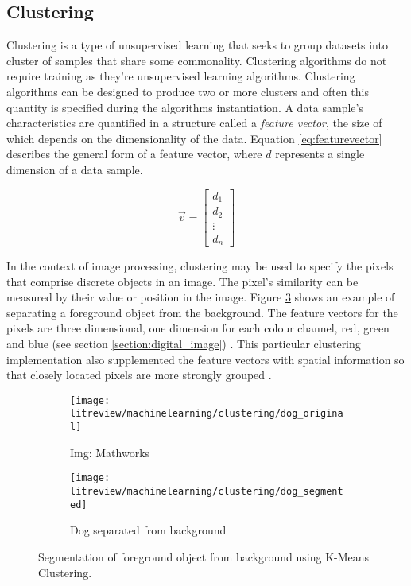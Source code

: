 \subsection{Clustering}
\label{subsection:clustering}
Clustering is a type of unsupervised learning that seeks to group datasets into cluster of samples that share some commonality. Clustering algorithms do not require training as they're unsupervised learning algorithms. Clustering algorithms can be designed to produce two or more clusters and often this quantity is specified during the algorithms instantiation. A data sample's characteristics are quantified in a structure called a \emph{feature vector}, the size of which depends on the dimensionality of the data. Equation \ref{eq:featurevector} describes the general form of a feature vector, where $d$ represents a single dimension of a data sample. 

\begin{equation}
    \vec{v} = 
    \begin{bmatrix}
        d_1 \\
        d_2 \\
        \vdots \\ 
        d_n
    \end{bmatrix}
    \label{eq:featurevector}
\end{equation}

In the context of image processing, clustering may be used to specify the pixels that comprise discrete objects in an image. The pixel's similarity can be measured by their value or position in the image. Figure \ref{fig:simple_cluster} shows an example of separating a foreground object from the background. The feature vectors for the pixels are three dimensional, one dimension for each colour channel, red, green and blue (see section \ref{section:digital_image}) \cite{patterns_machine_learning}. This particular clustering implementation also supplemented the feature vectors with spatial information so that closely located pixels are more strongly grouped \cite{matlab_kmeans_segment}.

\begin{figure}[H]
    \centering
     \begin{subfigure}[b]{0.45\textwidth}
        \texttt{[image: litreview/machinelearning/clustering/dog\_original]}
	\captionsetup{format = hang}
        \caption{Img: Mathworks}
        \label{fig:}
    \end{subfigure} 
    \begin{subfigure}[b]{0.45\textwidth}
        \texttt{[image: litreview/machinelearning/clustering/dog\_segmented]}	
	\captionsetup{format = hang}
        \caption{Dog separated from background \cite{matlab_kmeans_segment}}
        \label{fig:}
    \end{subfigure}
    \captionsetup{format = hang}
    \caption{Segmentation of foreground object from background using K-Means Clustering.}
    \label{fig:simple_cluster}
\end{figure}

    



